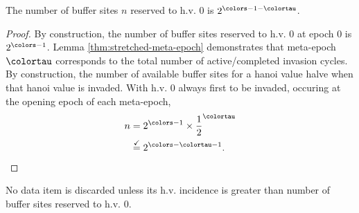 \begin{corollary}
\label{thm:num-hv0-reservations}
The number of buffer sites $n$ reserved to h.v. 0 is $2^{\colors-1-\colortau}$.
\end{corollary}

\begin{proof}
By construction, the number of buffer sites reserved to h.v. 0 at epoch 0 is $2^{\colors - 1}$.
Lemma \ref{thm:stretched-meta-epoch} demonstrates that meta-epoch $\colortau$ corresponds to the total number of active/completed invasion cycles.
By construction, the number of available buffer sites for a hanoi value halve when that hanoi value is invaded.
With h.v. 0 always first to be invaded, occuring at the opening epoch of each meta-epoch,
\begin{align*}
n
&= 2^{\colors - 1} \times \frac{1}{2}^{\colortau}\\
&\stackrel{\checkmark}{=} 2^{\colors - \colortau - 1}.
\end{align*}
\end{proof}

\begin{corollary}
\label{thm:discarded-incidence-count}
No data item is discarded unless its h.v. incidence is greater than number of buffer sites reserved to h.v. 0.
\end{corollary}

